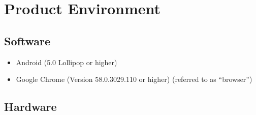 \section{Product Environment}



\subsection{Software}

\begin{itemize}
  \item Android (5.0 Lollipop or higher)
  \item Google Chrome (Version 58.0.3029.110 or higher) (referred to as ``browser'')
\end{itemize}

\subsection{Hardware}

